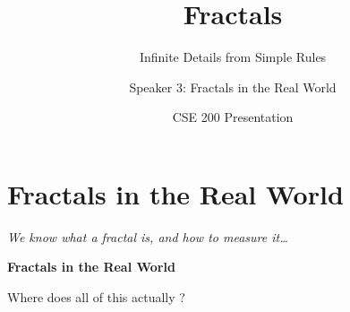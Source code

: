 

\title{Fractals}
\subtitle{Infinite Details from Simple Rules}
\author{Speaker 3: Fractals in the Real World}   %
\date{CSE 200 Presentation}

\newcommand{\takeaway}[1]{%
  \begin{tcolorbox}[colback=PrimaryColor!8, colframe=PrimaryColor, arc=2mm,
    boxrule=0.8pt, left=6pt, right=6pt, top=3pt, bottom=3pt]
    \small #1
  \end{tcolorbox}}
\newcommand{\source}[1]{{\scriptsize\color{DarkGray}#1}}



\begin{frame}
  \titlepage
\end{frame}

\section{Fractals in the Real World}

\begin{frame}{}
  \vfill
  \begin{center}
    {\large\color{SecondaryColor}\itshape
      We know what a fractal is, and how to measure it\ldots}

    \vspace{0.8cm}

    \vspace{0.8cm}
    {\fontsize{26}{32}\selectfont\bfseries\color{PrimaryColor}
      Fractals in the Real World}

    \vspace{0.5cm}
    {\small\color{DarkGray}
      Where does all of this actually ?}
  \end{center}
  \vfill
\end{frame}

